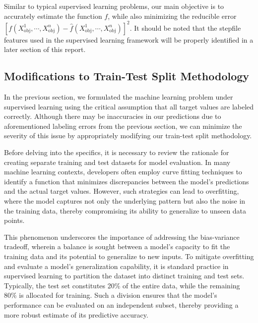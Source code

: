 Similar to typical supervised learning problems, our main objective is to accurately estimate the function $f$, while also minimizing the reducible error $[f(X_{\text{obj}}^1, \cdots, X_{\text{obj}}^n) - \hat{f}(X_{\text{obj}}^1, \cdots, X_{\text{obj}}^n)]^2$. It should be noted that the stepfile features used in the supervised learning framework will be properly identified in a later section of this report.


\subsection{Modifications to Train-Test Split Methodology}

In the previous section, we formulated the machine learning problem under supervised learning using the critical assumption that all target values are labeled correctly. Although there may be inaccuracies in our predictions due to aforementioned labeling errors from the previous section, we can minimize the severity of this issue by appropriately modifying our train-test split methodology.
\vspace{2mm}

Before delving into the specifics, it is necessary to review the rationale for creating separate training and test datasets for model evaluation. In many machine learning contexts, developers often employ curve fitting techniques to identify a function that minimizes discrepancies between the model's predictions and the actual target values. However, such strategies can lead to overfitting, where the model captures not only the underlying pattern but also the noise in the training data, thereby compromising its ability to generalize to unseen data points.

\vspace{2mm}
This phenomenon underscores the importance of addressing the bias-variance tradeoff, wherein a balance is sought between a model's capacity to fit the training data and its potential to generalize to new inputs. To mitigate overfitting and evaluate a model’s generalization capability, it is standard practice in supervised learning to partition the dataset into distinct training and test sets. Typically, the test set constitutes 20\% of the entire data, while the remaining 80\% is allocated for training. Such a division ensures that the model's performance can be evaluated on an independent subset, thereby providing a more robust estimate of its predictive accuracy.

